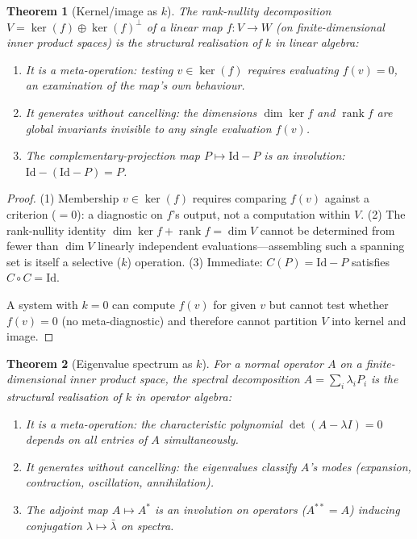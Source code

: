 \documentclass[11pt,a4paper]{article}
\newtheorem{theorem}{Theorem}
\newcommand{\recu}[1]{{\color{kcolor}#1}}
\def\recu#1{#1}%
\begin{document}
\begin{theorem}[Kernel/image as $\recu{k}$]
\label{thm:kerimg}
The rank-nullity decomposition $V = \ker(f) \oplus \ker(f)^\perp$ of
a linear map $f: V \to W$ (on finite-dimensional inner product spaces)
is the structural realisation of $\recu{k}$ in linear algebra:
\begin{enumerate}[nosep]
  \item It is a meta-operation: testing $v \in \ker(f)$ requires
    evaluating $f(v) = 0$, an examination of the map's own behaviour.
  \item It generates without cancelling: the dimensions $\dim\ker f$
    and $\operatorname{rank} f$ are global invariants invisible to any
    single evaluation $f(v)$.
  \item The complementary-projection map $P \mapsto \mathrm{Id} - P$
    is an involution: $\mathrm{Id} - (\mathrm{Id} - P) = P$.
\end{enumerate}
\end{theorem}

\begin{proof}
(1) Membership $v \in \ker(f)$ requires comparing $f(v)$ against a
criterion ($= 0$): a diagnostic on $f$'s output, not a computation
within $V$. (2) The rank-nullity identity
$\dim\ker f + \operatorname{rank} f = \dim V$ cannot be determined
from fewer than $\dim V$ linearly independent evaluations---assembling
such a spanning set is itself a selective ($\recu{k}$) operation.
(3) Immediate: $C(P) = \mathrm{Id} - P$ satisfies $C \circ C =
\mathrm{Id}$.

A system with $k = 0$ can compute $f(v)$ for given $v$ but cannot
test whether $f(v) = 0$ (no meta-diagnostic) and therefore cannot
partition $V$ into kernel and image.
\end{proof}

\begin{theorem}[Eigenvalue spectrum as $\recu{k}$]
\label{thm:spectrum}
For a normal operator $A$ on a finite-dimensional inner product space,
the spectral decomposition $A = \sum_i \lambda_i P_i$ is the structural
realisation of $\recu{k}$ in operator algebra:
\begin{enumerate}[nosep]
  \item It is a meta-operation: the characteristic polynomial
    $\det(A - \lambda I) = 0$ depends on all entries of $A$
    simultaneously.
  \item It generates without cancelling: the eigenvalues classify
    $A$'s modes (expansion, contraction, oscillation, annihilation).
  \item The adjoint map $A \mapsto A^*$ is an involution on operators
    ($A^{**} = A$) inducing conjugation $\lambda \mapsto \bar\lambda$
    on spectra.
\end{enumerate}
\end{theorem}
\end{document}
